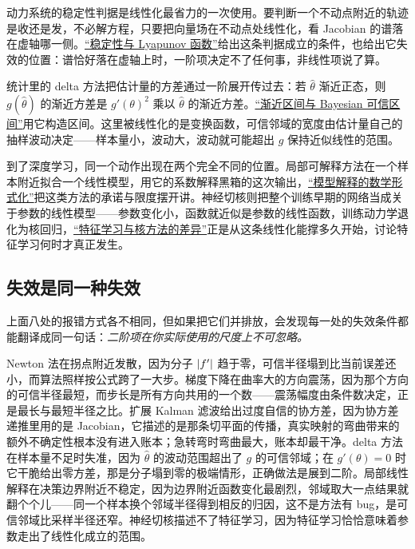 动力系统的稳定性判据是线性化最省力的一次使用。要判断一个不动点附近的轨迹是收还是发，不必解方程，只要把向量场在不动点处线性化，看 Jacobian 的谱落在虚轴哪一侧。\hyperref[sec:15-Differential-Equations-and-Dynamical-Systems/02-Stability-and-Dynamical-Systems/02]{``稳定性与 Lyapunov 函数''}给出这条判据成立的条件，也给出它失效的位置：谱恰好落在虚轴上时，一阶项决定不了任何事，非线性项说了算。

统计里的 delta 方法把估计量的方差通过一阶展开传过去：若 \(\hat\theta\) 渐近正态，则 \(g(\hat\theta)\) 的渐近方差是 \(g'(\theta)^{2}\) 乘以 \(\hat\theta\) 的渐近方差。\hyperref[sec:11-Mathematical-Statistics/04-Interval-Estimation/03]{``渐近区间与 Bayesian 可信区间''}用它构造区间。这里被线性化的是变换函数，可信邻域的宽度由估计量自己的抽样波动决定——样本量小，波动大，波动就可能超出 \(g\) 保持近似线性的范围。

到了深度学习，同一个动作出现在两个完全不同的位置。局部可解释方法在一个样本附近拟合一个线性模型，用它的系数解释黑箱的这次输出，\hyperref[sec:14-Deep-Learning/10-Interpretability-Mathematics/04]{``模型解释的数学形式化''}把这类方法的承诺与限度摆开讲。神经切核则把整个训练早期的网络当成关于参数的线性模型——参数变化小，函数就近似是参数的线性函数，训练动力学退化为核回归，\hyperref[sec:14-Deep-Learning/10-Interpretability-Mathematics/02]{``特征学习与核方法的差异''}正是从这条线性化能撑多久开始，讨论特征学习何时才真正发生。

\subsection{失效是同一种失效}

上面八处的报错方式各不相同，但如果把它们并排放，会发现每一处的失效条件都能翻译成同一句话：\emph{二阶项在你实际使用的尺度上不可忽略。}

Newton 法在拐点附近发散，因为分子 \(\left|f'\right|\) 趋于零，可信半径塌到比当前误差还小，而算法照样按公式跨了一大步。梯度下降在曲率大的方向震荡，因为那个方向的可信半径最短，而步长是所有方向共用的一个数——震荡幅度由条件数决定，正是最长与最短半径之比。扩展 Kalman 滤波给出过度自信的协方差，因为协方差递推里用的是 Jacobian，它描述的是那条切平面的传播，真实映射的弯曲带来的额外不确定性根本没有进入账本；急转弯时弯曲最大，账本却最干净。delta 方法在样本量不足时失准，因为 \(\hat\theta\) 的波动范围超出了 \(g\) 的可信邻域；在 \(g'(\theta)=0\) 时它干脆给出零方差，那是分子塌到零的极端情形，正确做法是展到二阶。局部线性解释在决策边界附近不稳定，因为边界附近函数变化最剧烈，邻域取大一点结果就翻个个儿——同一个样本换个邻域半径得到相反的归因，这不是方法有 bug，是可信邻域比采样半径还窄。神经切核描述不了特征学习，因为特征学习恰恰意味着参数走出了线性化成立的范围。

